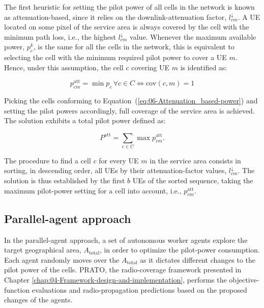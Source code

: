 The first heuristic for setting the pilot power of all cells in the
network is known as attenuation-based, since it relies on the downlink-attenuation
factor, $l_{cm}^{\downarrow}$. A UE located on some pixel of the
service area is always covered by the cell with the minimum path loss,
i.e., the highest $l{}_{cm}^{\downarrow}$ value. Whenever the maximum
available power, $p_{c}^{k}$, is the same for all the cells in the
network, this is equivalent to selecting the cell with the minimum
required pilot power to cover a UE $m$. Hence, under this assumption,
the cell $c$ covering UE $m$ is identified as:

\begin{equation}
p_{cm}^{\mathrm{att}}=\min p_{c}\,\forall c\in C\iff\mathrm{cov}(c,m)=1\label{eq:06-Attenuation_based-power}
\end{equation}


Picking the cells conforming to Equation~(\ref{eq:06-Attenuation_based-power})
and setting the pilot powers accordingly, full coverage of the service
area is achieved. The solution exhibits a total pilot power defined
as:

\begin{equation}
P^{\mathrm{att}}=\sum_{c\in C}\max p_{cm}^{\mathrm{att}}.
\end{equation}


The procedure to find a cell $c$ for every UE $m$ in the service
area consists in sorting, in descending order, all UEs by their attenuation-factor
values, $l_{cm}^{\downarrow}$. The solution is thus established by
the first $b$ UEs of the sorted sequence, taking the maximum pilot-power
setting for a cell into account, i.e., $p_{cm}^{\mathrm{att}}$.


\subsection{Parallel-agent approach \label{sub:06-Parallel_agent_approach}}

In the parallel-agent approach, a set of autonomous worker agents
explore the target geographical area, $A_{\mathrm{total}}$, in order
to optimize the pilot-power consumption. Each agent randomly moves
over the $A_{\mathrm{total}}$ as it dictates different changes to
the pilot power of the cells. PRATO, the radio-coverage framework
presented in Chapter \ref{chap:04-Framework-design-and-implementation},
performs the objective-function evaluations and radio-propagation
predictions based on the proposed changes of the agents.

